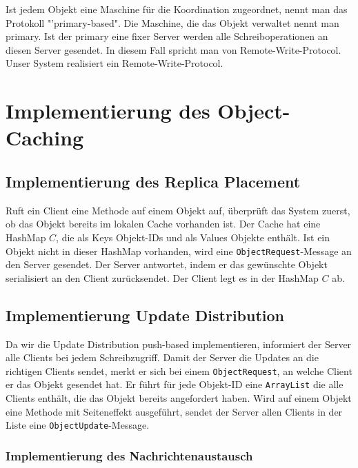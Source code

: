 Ist jedem Objekt eine Maschine für die Koordination zugeordnet, nennt man das Protokoll "'primary-based"\cite{tanenbaum07}. Die Maschine, die das Objekt verwaltet nennt man primary. Ist der primary eine fixer Server werden alle Schreiboperationen an diesen Server gesendet. In diesem Fall spricht man von Remote-Write-Protocol. Unser System realisiert ein Remote-Write-Protocol.

\section{Implementierung des Object-Caching}
\label{sec:impl-object-kons}

\subsection{Implementierung des Replica Placement}
\label{sec:impl-des-repl-1}

Ruft ein Client eine Methode auf einem Objekt auf, überprüft das System zuerst, ob das Objekt bereits im lokalen Cache vorhanden ist. Der Cache hat eine HashMap $C$, die als Keys Objekt-IDs und als Values Objekte enthält. Ist ein Objekt nicht in dieser HashMap vorhanden, wird eine \verb+ObjectRequest+-Message an den Server gesendet. Der Server antwortet, indem er das ge\-wünsch\-te Objekt serialisiert an den Client zurücksendet. Der Client legt es in der HashMap $C$ ab. 

\subsection{Implementierung Update Distribution}
\label{sec:impl-update-distr}

Da wir die Update Distribution push-based implementieren, informiert der Server alle Clients bei jedem Schreibzugriff. Damit der Server die Updates an die richtigen Clients sendet, merkt er sich bei einem \verb|ObjectRequest|, an welche Client er das Objekt gesendet hat. Er führt für jede Objekt-ID eine \verb|ArrayList| die alle Clients enthält, die das Objekt bereits angefordert haben. Wird auf einem Objekt eine Methode mit Seiteneffekt ausgeführt, sendet der Server allen Clients in der Liste eine \verb|ObjectUpdate|-Message.

\subsubsection{Implementierung des Nachrichtenaustausch}
\label{sec:impl-des-nachr}

